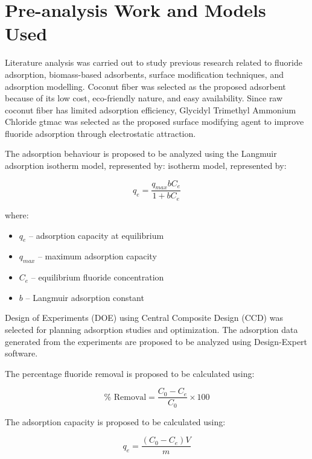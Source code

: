\section{Pre-analysis Work and Models Used }
Literature analysis was carried out to study previous research related to fluoride adsorption, biomass-based adsorbents, surface modification techniques, and adsorption modelling. Coconut fiber was selected as the proposed adsorbent because of its low cost, eco-friendly nature, and easy availability. Since raw coconut fiber has limited adsorption efficiency, Glycidyl Trimethyl Ammonium Chloride \gls{gtmac} was selected as the proposed surface modifying agent to improve fluoride adsorption through electrostatic attraction. 

The adsorption behaviour is proposed to be analyzed using the Langmuir adsorption isotherm model, represented by: 
isotherm model, represented by:

\begin{equation}
	q_e = \frac{q_{max} b C_e}{1 + b C_e}
	\label{eq:langmuir2}
\end{equation}

where:
\begin{itemize}
	\item $q_e$ -- adsorption capacity at equilibrium
	\item $q_{max}$ -- maximum adsorption capacity
	\item $C_e$ -- equilibrium fluoride concentration
	\item $b$ -- Langmuir adsorption constant
\end{itemize}

Design of Experiments (DOE) using Central Composite Design (CCD) was selected for planning adsorption studies and optimization. The adsorption data generated from the experiments are proposed to be analyzed using Design-Expert software.

The percentage fluoride removal is proposed to be calculated using:

\begin{equation}
	\% \text{ Removal} = \frac{C_0 - C_e}{C_0} \times 100
	\label{eq:removal}
\end{equation}

The adsorption capacity is proposed to be calculated using:

\begin{equation}
	q_e = \frac{(C_0 - C_e)V}{m}
	\label{eq:capacity}
\end{equation}	

